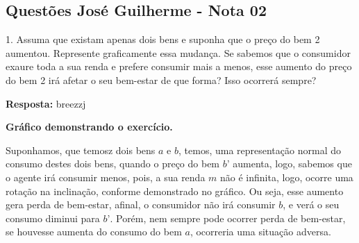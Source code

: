 

\begin{center}
	\section*{Questões José Guilherme - Nota 02}
\end{center}

\begin{flushleft}

1. Assuma que existam apenas dois bens e suponha que o preço do bem 2 aumentou. Represente graficamente essa mudança. Se sabemos que o consumidor exaure toda a sua renda e prefere consumir mais a menos, esse aumento do preço do bem 2 irá afetar o seu bem-estar de que forma? Isso ocorrerá sempre? \singlespacing

\textbf{Resposta:} breezzj


\begin{center}
\textbf{Gráfico demonstrando o exercício.} 
\singlespacing
{}    
\singlespacing

\end{center}
Suponhamos, que temosz dois bens $\textit{a}$ e $\textit{b}$, temos, uma representação normal do consumo destes dois bens, quando o preço do bem $\textit{b'}$ aumenta, logo, sabemos que o agente irá consumir menos, pois, a sua renda $\textit{m}$ não é infinita, logo, ocorre uma rotação na inclinação, conforme demonstrado no gráfico. Ou seja, esse aumento gera perda de bem-estar, afinal, o consumidor não irá consumir $\textit{b}$, e verá o seu consumo diminui para $\textit{b'}$. Porém, nem sempre pode ocorrer perda de bem-estar, se houvesse aumenta do consumo do bem $\textit{a}$, ocorreria uma situação adversa. \singlespacing


\end{flushleft}
